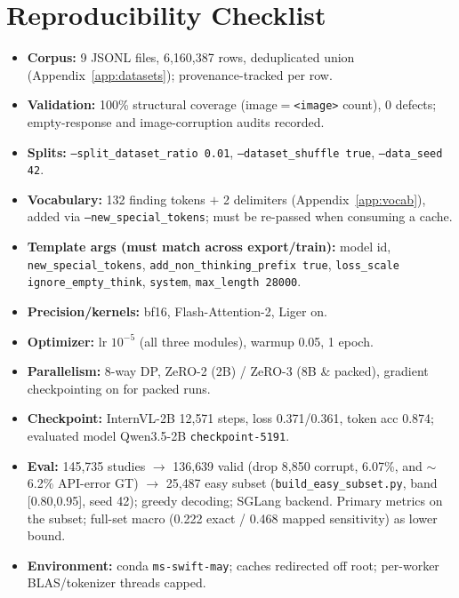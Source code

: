 \documentclass[11pt,a4paper]{article}
\begin{document}
\section{Reproducibility Checklist}
\label{app:repro}
\begin{itemize}[leftmargin=1.4em]
  \item \textbf{Corpus:} 9 JSONL files, 6{,}160{,}387 rows, deduplicated union (Appendix~\ref{app:datasets}); provenance-tracked per row.
  \item \textbf{Validation:} 100\% structural coverage (image$=$\texttt{<image>} count), 0 defects; empty-response and image-corruption audits recorded.
  \item \textbf{Splits:} \texttt{--split\_dataset\_ratio 0.01}, \texttt{--dataset\_shuffle true}, \texttt{--data\_seed 42}.
  \item \textbf{Vocabulary:} 132 finding tokens $+$ 2 delimiters (Appendix~\ref{app:vocab}), added via \texttt{--new\_special\_tokens}; must be re-passed when consuming a cache.
  \item \textbf{Template args (must match across export/train):} model id, \texttt{new\_special\_tokens}, \texttt{add\_non\_thinking\_prefix true}, \texttt{loss\_scale ignore\_empty\_think}, \texttt{system}, \texttt{max\_length 28000}.
  \item \textbf{Precision/kernels:} bf16, Flash-Attention-2, Liger on.
  \item \textbf{Optimizer:} lr $10^{-5}$ (all three modules), warmup 0.05, 1 epoch.
  \item \textbf{Parallelism:} 8-way DP, ZeRO-2 (2B) / ZeRO-3 (8B \& packed), gradient checkpointing on for packed runs.
  \item \textbf{Checkpoint:} InternVL-2B 12{,}571 steps, loss 0.371/0.361, token acc 0.874; evaluated model Qwen3.5-2B \texttt{checkpoint-5191}.
  \item \textbf{Eval:} 145{,}735 studies $\rightarrow$ 136{,}639 valid (drop 8{,}850 corrupt, 6.07\%, and $\sim$6.2\% API-error GT) $\rightarrow$ 25{,}487 easy subset (\texttt{build\_easy\_subset.py}, band [0.80,0.95], seed 42); greedy decoding; SGLang backend. Primary metrics on the subset; full-set macro (0.222 exact / 0.468 mapped sensitivity) as lower bound.
  \item \textbf{Environment:} conda \texttt{ms-swift-may}; caches redirected off root; per-worker BLAS/tokenizer threads capped.
\end{itemize}
\end{document}
